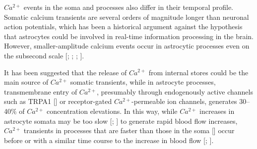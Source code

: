 $Ca^{2+}$ events in the soma and processes also differ in their temporal profile.
Somatic calcium transients are several orders of magnitude longer than neuronal action potentials, which has been a historical argument against the hypothesis that astrocytes could be involved in real-time information processing in the brain.
However, smaller-amplitude calcium events occur in astrocytic processes even on the subsecond scale [\cite{winship2007}; \cite{lind2013}; \cite{lind2018}; \cite{stobart2018}].

It has been suggested that the release of $Ca^{2+}$ from internal stores could be the main source of $Ca^{2+}$ somatic transients, while in astrocyte processes, transmembrane entry of $Ca^{2+}$, presumably through endogenously active channels such as TRPA1 [\cite{shigetomi2012trpa1}] or receptor-gated $Ca^{2+}$-permeable ion channels, generates 30–40\% of $Ca^{2+}$ concentration elevations. 
In this way, while $Ca^{2+}$ increases in astrocyte somata may be too slow [\cite{schummers2008}; \cite{schulz2012iron}] to generate rapid blood flow increases, $Ca^{2+}$ transients in processes that are faster than those in the soma [\cite{tang2015stimulation}] occur before or with a similar time course to the increase in blood flow [\cite{lind2013}; \cite{otsu2015calcium}].


